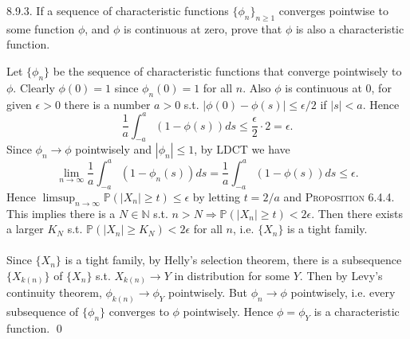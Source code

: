 \begin{exercise}8.9.3. If a sequence of characteristic functions $\{\phi_n\}_{n\geq1}$ converges pointwise to some function $\phi$, and $\phi$ is continuous at zero, prove that $\phi$ is also a characteristic function.
\end{exercise}
\begin{answer}
Let $\{\phi_n\}$ be the sequence of characteristic functions that converge pointwisely to $\phi$. Clearly $\phi(0)=1$ since $\phi_n(0)=1$ for all $n$. Also $\phi$ is continuous at $0$, for given $\epsilon>0$ there is a number $a>0$ s.t. $|\phi(0)-\phi(s)|\leq\epsilon/2$ if $|s|<a$. Hence
\begin{equation*}
    \frac{1}{a}\int_{-a}^a(1-\phi(s))ds\leq\frac{\epsilon}{2}\cdot 2=\epsilon.
\end{equation*}
Since $\phi_n\rightarrow\phi$ pointwisely and $|\phi_n|\leq 1$, by LDCT we have
\begin{equation*}
    \lim_{n\rightarrow\infty}\frac{1}{a}\int_{-a}^a(1-\phi_n(s))ds=\frac{1}{a}\int_{-a}^a(1-\phi(s))ds\leq\epsilon.
\end{equation*}
Hence $\limsup_{n\rightarrow\infty}\mathbb{P}(|X_n|\geq t)\leq\epsilon$ by letting $t=2/a$ and \textsc{Proposition 6.4.4.} This implies there is a $N\in\mathbb{N}$ s.t. $n>N\Rightarrow\mathbb{P}(|X_n|\geq t)<2\epsilon$. Then there exists a larger $K_N$ s.t. $\mathbb{P}(|X_n|\geq K_N)<2\epsilon$ for all $n$, i.e. $\{X_n\}$ is a tight family.\\ \\
Since $\{X_n\}$ is a tight family, by Helly’s selection theorem, there is a subsequence $\{X_{k(n)}\}$ of $\{X_n\}$ s.t. $X_{k(n)}\rightarrow Y$ in distribution for some $Y$. Then by Levy’s continuity theorem, $\phi_{k(n)}\rightarrow\phi_Y$ pointwisely. But $\phi_{n}\rightarrow\phi$ pointwisely, i.e. every subsequence of $\{\phi_n\}$ converges to $\phi$ pointwisely. Hence $\phi=\phi_Y$ is a characteristic function.
\qed\qquad
\end{answer}

\newpage

